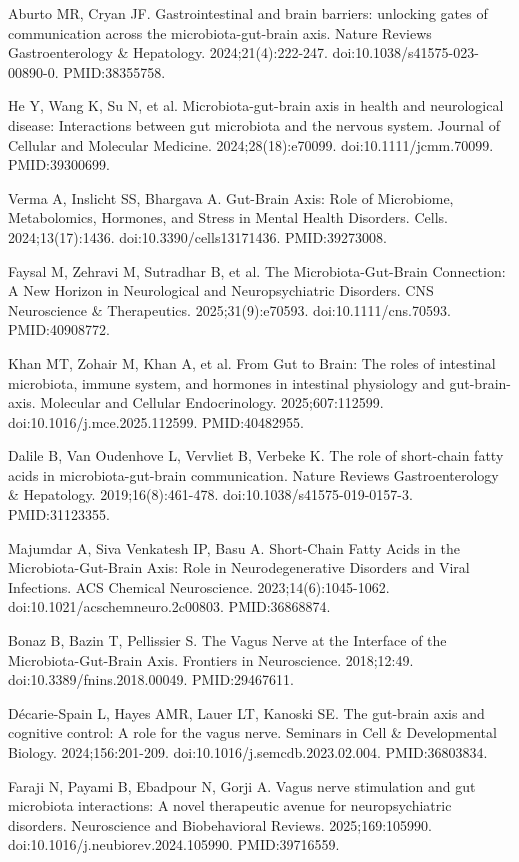 \documentclass[12pt,oneside]{book}
\newcommand{\reff}[2]{\par\hangindent=7mm\hangafter=1\noindent[#1]\hspace{2mm}#2\par}
\begin{document}
\reff{20}{Aburto MR, Cryan JF. Gastrointestinal and brain barriers: unlocking gates of communication across the microbiota-gut-brain axis. Nature Reviews Gastroenterology \& Hepatology. 2024;21(4):222-247. doi:10.1038/s41575-023-00890-0. PMID:38355758.}

\reff{21}{He Y, Wang K, Su N, et al. Microbiota-gut-brain axis in health and neurological disease: Interactions between gut microbiota and the nervous system. Journal of Cellular and Molecular Medicine. 2024;28(18):e70099. doi:10.1111/jcmm.70099. PMID:39300699.}

\reff{22}{Verma A, Inslicht SS, Bhargava A. Gut-Brain Axis: Role of Microbiome, Metabolomics, Hormones, and Stress in Mental Health Disorders. Cells. 2024;13(17):1436. doi:10.3390/cells13171436. PMID:39273008.}

\reff{23}{Faysal M, Zehravi M, Sutradhar B, et al. The Microbiota-Gut-Brain Connection: A New Horizon in Neurological and Neuropsychiatric Disorders. CNS Neuroscience \& Therapeutics. 2025;31(9):e70593. doi:10.1111/cns.70593. PMID:40908772.}

\reff{24}{Khan MT, Zohair M, Khan A, et al. From Gut to Brain: The roles of intestinal microbiota, immune system, and hormones in intestinal physiology and gut-brain-axis. Molecular and Cellular Endocrinology. 2025;607:112599. doi:10.1016/j.mce.2025.112599. PMID:40482955.}

\reff{25}{Dalile B, Van Oudenhove L, Vervliet B, Verbeke K. The role of short-chain fatty acids in microbiota-gut-brain communication. Nature Reviews Gastroenterology \& Hepatology. 2019;16(8):461-478. doi:10.1038/s41575-019-0157-3. PMID:31123355.}

\reff{26}{Majumdar A, Siva Venkatesh IP, Basu A. Short-Chain Fatty Acids in the Microbiota-Gut-Brain Axis: Role in Neurodegenerative Disorders and Viral Infections. ACS Chemical Neuroscience. 2023;14(6):1045-1062. doi:10.1021/acschemneuro.2c00803. PMID:36868874.}

\reff{27}{Bonaz B, Bazin T, Pellissier S. The Vagus Nerve at the Interface of the Microbiota-Gut-Brain Axis. Frontiers in Neuroscience. 2018;12:49. doi:10.3389/fnins.2018.00049. PMID:29467611.}

\reff{28}{Décarie-Spain L, Hayes AMR, Lauer LT, Kanoski SE. The gut-brain axis and cognitive control: A role for the vagus nerve. Seminars in Cell \& Developmental Biology. 2024;156:201-209. doi:10.1016/j.semcdb.2023.02.004. PMID:36803834.}

\reff{29}{Faraji N, Payami B, Ebadpour N, Gorji A. Vagus nerve stimulation and gut microbiota interactions: A novel therapeutic avenue for neuropsychiatric disorders. Neuroscience and Biobehavioral Reviews. 2025;169:105990. doi:10.1016/j.neubiorev.2024.105990. PMID:39716559.}
\end{document}
